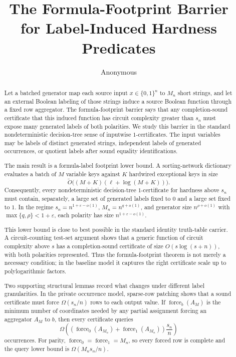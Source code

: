 \documentclass[11pt]{article}
\title{The Formula-Footprint Barrier\\
\large for Label-Induced Hardness Predicates}
\author{Anonymous}
\date{}
\theoremstyle{definition}
\newcommand{\bits}{\{0,1\}}
\newcommand{\Force}{\operatorname{force}}
\newcommand{\eps}{\varepsilon}
\begin{document}
\maketitle

\begin{abstract}
Let a batched generator map each source input $x\in\bits^n$ to $M_n$ short strings, and let an external Boolean labeling of those strings induce a source Boolean function through a fixed row aggregator.  The formula-footprint barrier says that any completion-sound certificate that this induced function has circuit complexity greater than \(s_n\) must expose many generated labels of both polarities.  We study this barrier in the standard nondeterministic decision-tree sense of inputwise \(1\)-certificates.  The input variables may be labels of distinct generated strings, independent labels of generated occurrences, or quotient labels after sound equality identifications.

The main result is a formula-label footprint lower bound.  A sorting-network dictionary evaluates a batch of $M$ variable keys against $K$ hardwired exceptional keys in size
\[
  \widetilde O\bigl((M+K)(\ell+\log(M+K))\bigr).
\]
Consequently, every nondeterministic decision-tree \(1\)-certificate for hardness above $s_n$ must contain, separately, a large set of generated labels fixed to $0$ and a large set fixed to $1$.  In the regime $s_n=n^{1+\eps-o(1)}$, $M_n=n^{q+o(1)}$, and generator size $n^{\rho+o(1)}$ with $\max\{q,\rho\}<1+\eps$, each polarity has size $n^{1+\eps-o(1)}$.

This lower bound is close to best possible in the standard identity truth-table carrier.  A circuit-counting test-set argument shows that a generic function of circuit complexity above \(s\) has a completion-sound certificate of size \(O(s\log(s+n))\), with both polarities represented.  Thus the formula-footprint theorem is not merely a necessary condition; in the baseline model it captures the right certificate scale up to polylogarithmic factors.

Two supporting structural lemmas record what changes under different label granularities.  In the private occurrence model, sparse-row patching shows that a sound certificate must force $\Omega(s_n/n)$ rows to each output value.  If $\Force_b(A_M)$ is the minimum number of coordinates needed by any partial assignment forcing an aggregator $A_M$ to $b$, then every certificate queries
\[
  \Omega\!\left((\Force_0(A_{M_n})+\Force_1(A_{M_n}))\frac{s_n}{n}\right)
\]
occurrences.  For parity, $\Force_0=\Force_1=M_n$, so every forced row is complete and the query lower bound is $\Omega(M_ns_n/n)$.


\end{abstract}
\end{document}
